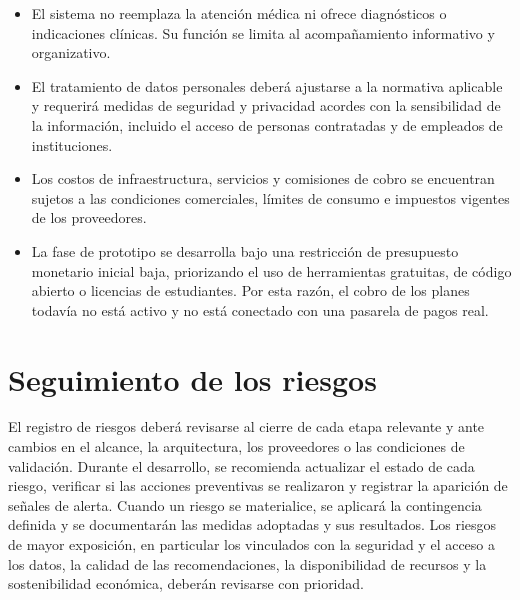 \begin{itemize}
    \item El sistema no reemplaza la atención médica ni ofrece diagnósticos o indicaciones clínicas. Su función se limita al acompañamiento informativo y organizativo.
    \item El tratamiento de datos personales deberá ajustarse a la normativa aplicable y requerirá medidas de seguridad y privacidad acordes con la sensibilidad de la información, incluido el acceso de personas contratadas y de empleados de instituciones.
    \item Los costos de infraestructura, servicios y comisiones de cobro se encuentran sujetos a las condiciones comerciales, límites de consumo e impuestos vigentes de los proveedores.
    \item La fase de prototipo se desarrolla bajo una restricción de presupuesto monetario inicial baja, priorizando el uso de herramientas gratuitas, de código abierto o licencias de estudiantes. Por esta razón, el cobro de los planes todavía no está activo y no está conectado con una pasarela de pagos real.
\end{itemize}

\section{Seguimiento de los riesgos}

El registro de riesgos deberá revisarse al cierre de cada etapa relevante y ante cambios en el alcance, la arquitectura, los proveedores o las condiciones de validación. Durante el desarrollo, se recomienda actualizar el estado de cada riesgo, verificar si las acciones preventivas se realizaron y registrar la aparición de señales de alerta. Cuando un riesgo se materialice, se aplicará la contingencia definida y se documentarán las medidas adoptadas y sus resultados. Los riesgos de mayor exposición, en particular los vinculados con la seguridad y el acceso a los datos, la calidad de las recomendaciones, la disponibilidad de recursos y la sostenibilidad económica, deberán revisarse con prioridad.

